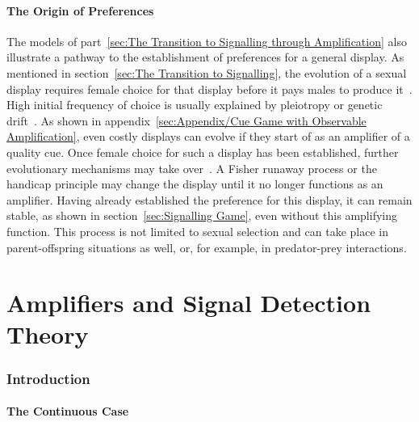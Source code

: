 \documentclass[a4paper,12pt]{article}
\numberwithin{equation}{section}
\begin{document}
\subsection{The Origin of Preferences}
\label{sec:The Origin of Preferences}

 The models of part~\ref{sec:The Transition to Signalling through Amplification} also illustrate a pathway to the establishment of preferences for a general display. As mentioned in section~\ref{sec:The Transition to Signalling}, the evolution of a sexual display requires female choice for that display before it pays males to produce it~\cite{Kirkpatrick1982, Pomiankowski1987}. High initial frequency of choice is usually explained by pleiotropy or genetic drift~\cite{Kirkpatrick1982, Heisler1984}. As shown in appendix~\ref{sec:Appendix/Cue Game with Observable Amplification}, even costly displays can evolve if they start of as an amplifier of a quality cue. Once female choice for such a display has been established, further evolutionary mechanisms may take over~\cite{Hasson1990, Hasson1991}. A Fisher runaway process or the handicap principle may change the display until it no longer functions as an amplifier. Having already established the preference for this display, it can remain stable, as shown in section~\ref{sec:Signalling Game}, even without this amplifying function. This process is not limited to sexual selection and can take place in parent-offspring situations as well, or, for example, in predator-prey interactions.

\newpage\clearpage
{}


\part{Amplifiers and Signal Detection Theory}
\label{sec:Amplifiers and Signal Detection Theory}

\newpage\clearpage


\section{Introduction}
\label{sec:Part3/Introduction}
\subsection{The Continuous Case}
\label{sec:The Continuous Case}
\end{document}
